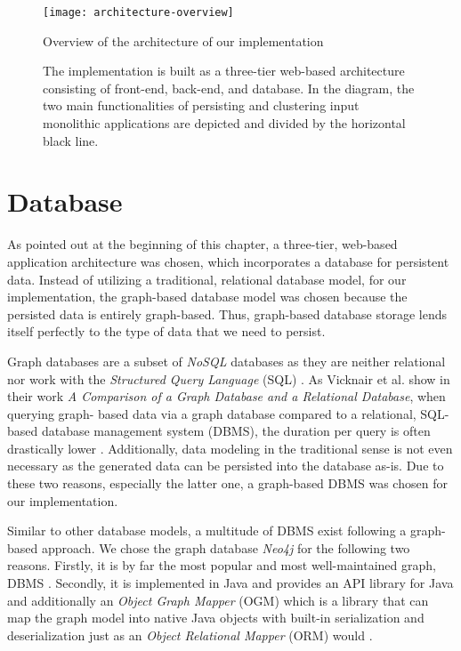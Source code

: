 \documentclass[12pt,a4paper]{report}
\begin{document}
\begin{figure}[htbp]
\centering
\texttt{[image: architecture-overview]}
\caption{Overview of the architecture of our implementation}
\caption*{\centering
    The implementation is built as a three-tier web-based architecture consisting of
    front-end, back-end, and database. In the diagram, the two main functionalities of
    persisting and clustering input monolithic applications are depicted and
    divided by the horizontal black line.
}
\label{fig:architecture-overview}
\end{figure}



\section{Database} \label{sect:implementation-database}

As pointed out at the beginning of this chapter, a three-tier, web-based
application architecture was chosen, which incorporates a database for
persistent data. Instead of utilizing a traditional, relational database model,
for our implementation, the graph-based database model was chosen because the
persisted data is entirely graph-based. Thus, graph-based database storage
lends itself perfectly to the type of data that we need to persist.

Graph databases are a subset of \textit{NoSQL} databases as they are neither
relational nor work with the \textit{Structured Query Language} (SQL) \cite{
vicknair2010graphdatabase}. As Vicknair et al. show in their work \textit{
A Comparison of a Graph Database and a Relational Database}, when querying graph\hyp
based data via a graph database compared to a relational, SQL-based database
management system (DBMS), the duration per query is often drastically lower
\cite{vicknair2010graphdatabase}. Additionally, data modeling in the
traditional sense is not even necessary as the generated data can be persisted
into the database as-is. Due to these two reasons, especially the latter one,
a graph\hyp based DBMS was chosen for our implementation.

Similar to other database models, a multitude of DBMS exist following a graph\hyp
based approach. We chose the graph database \textit{Neo4j} for the following
two reasons. Firstly, it is by far the most popular and most well-maintained
graph, DBMS \cite{graph-dbms-ranking}. Secondly, it is implemented in Java and
provides an API library for Java and additionally an \textit{Object Graph
Mapper} (OGM) which is a library that can map the graph model into native Java
objects with built-in serialization and deserialization just as an \textit{
Object Relational Mapper} (ORM) would \cite{neo4j-ogm}.
\end{document}
